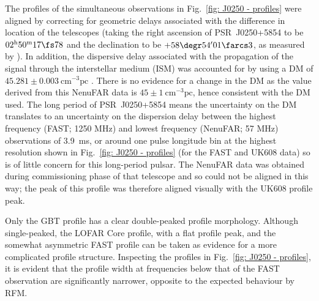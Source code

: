 The profiles of the simultaneous observations in Fig.~\ref{fig: J0250 - profiles} were aligned by correcting for geometric delays associated with the difference in location of the telescopes (taking the right ascension of PSR~J0250+5854 to be $02^\mathrm{h}50^\mathrm{m}17\fs78$ and the declination to be $+58\degr54'01\farcs3$, as measured by \citealt{TBC+2018}). In addition, the dispersive delay associated with the propagation of the signal through the interstellar medium (ISM) was accounted for by using a DM of $45.281\pm0.003\ \mathrm{cm}^{-3}\mathrm{pc}$ \citep{TBC+2018}. There is no evidence for a change in the DM as the value derived from this NenuFAR data is $45\pm1\ \mathrm{cm}^{-3}\mathrm{pc}$, hence consistent with the DM used. The long period of PSR~J0250+5854 means the uncertainty on the DM translates to an uncertainty on the dispersion delay between the highest frequency (FAST; 1250 MHz) and lowest frequency (NenuFAR; 57 MHz) observations of 3.9~ms, or around one pulse longitude bin at the highest resolution shown in Fig.~\ref{fig: J0250 - profiles} (for the FAST and UK608 data) so is of little concern for this long-period pulsar. The NenuFAR data was obtained during commissioning phase of that telescope and so could not be aligned in this way; the peak of this profile was therefore aligned visually with the UK608 profile peak.

Only the GBT profile has a clear double-peaked profile morphology. Although single-peaked, the LOFAR Core profile, with a flat profile peak, and the somewhat asymmetric FAST profile can be taken as evidence for a more complicated profile structure. Inspecting the profiles in Fig.~\ref{fig: J0250 - profiles}, it is evident that the profile width at frequencies below that of the FAST observation are significantly narrower, opposite to the expected behaviour by RFM. 

